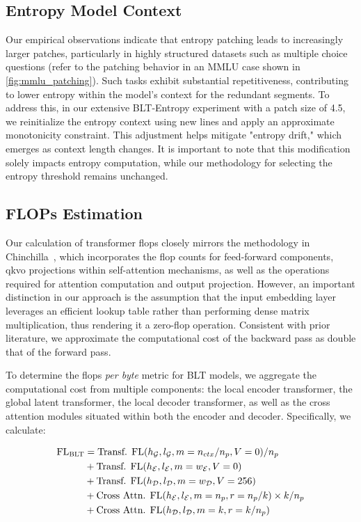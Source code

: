 \subsection{Entropy Model Context}
\label{section:entropy-context}
Our empirical observations indicate that entropy patching leads to increasingly larger patches, particularly in highly structured datasets such as multiple choice questions (refer to the patching behavior in an MMLU case shown in \autoref{fig:mmlu_patching}). Such tasks exhibit substantial repetitiveness, contributing to lower entropy within the model's context for the redundant segments. To address this, in our extensive {\textsc BLT}-Entropy experiment with a patch size of 4.5, we reinitialize the entropy context using new lines and apply an approximate monotonicity constraint. This adjustment helps mitigate "entropy drift," which emerges as context length changes. It is important to note that this modification solely impacts entropy computation, while our methodology for selecting the entropy threshold remains unchanged.

\subsection{FLOPs Estimation} 
\label{section:flops}

Our calculation of transformer flops closely mirrors the methodology in Chinchilla~\citep{hoffmann2022training}, which incorporates the flop counts for feed-forward components, qkvo projections within self-attention mechanisms, as well as the operations required for attention computation and output projection. However, an important distinction in our approach is the assumption that the input embedding layer leverages an efficient lookup table rather than performing dense matrix multiplication, thus rendering it a zero-flop operation. Consistent with prior literature, we approximate the computational cost of the backward pass as double that of the forward pass.

To determine the flops \textit{per byte} metric for {\textsc BLT} models, we aggregate the computational cost from multiple components: the local encoder transformer, the global latent transformer, the local decoder transformer, as well as the cross attention modules situated within both the encoder and decoder. Specifically, we calculate:

\begin{align}
    \text{FL}_{\text{{\textsc BLT}}} &= \text{Transf. FL}(h_{\mathcal{G}}, l_{\mathcal{G}}, m=n_{ctx}/n_p,V=0) / n_p\\
   &+\text{Transf. FL}(h_{\mathcal{E}}, l_{\mathcal{E}}, m=w_{\mathcal{E}}, V=0) \\
   &+ \text{Transf. FL}(h_{\mathcal{D}}, l_{\mathcal{D}}, m=w_{\mathcal{D}}, V=256) \\ 
    &+ \text{Cross Attn. FL}(h_{\mathcal{E}}, l_{\mathcal{E}}, m=n_p, r=n_p/k) \times k/n_p \\ 
   &+ \text{Cross Attn. FL}(h_{\mathcal{D}}, l_{\mathcal{D}}, m=k, r=k/n_p) 
\end{align}

